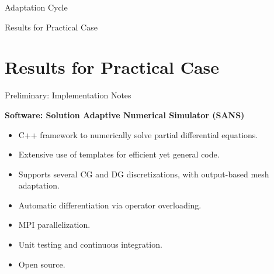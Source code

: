 \documentclass{beamer}
\newcounter{sectionframes}
\newcommand{\setsectionframes}[1]{%
  \setcounter{sectionframes}{#1}%
}
\newcounter{sectionframecount}
\begin{document}
\begin{frame}[t]{Adaptation Cycle}


\end{frame}


\begin{frame}[plain]
  \vfill
  \centering
  {Results for Practical Case}
  \vfill
\end{frame}


\section{Results for Practical Case}

\setsectionframes{10}


\begin{frame}[t]{Preliminary: Implementation Notes}

\textbf{Software: Solution Adaptive Numerical Simulator (SANS)\footnotemark}
\begin{itemize}
  \item C++ framework to numerically solve partial differential equations.
  \item Extensive use of templates for efficient yet general code.
  \item Supports several CG and DG discretizations, with output-based mesh adaptation.
  \item Automatic differentiation via operator overloading.
  \item MPI parallelization.
  \item Unit testing and continuous integration.
  \item Open source.
\end{itemize}


\end{frame}
\end{document}
